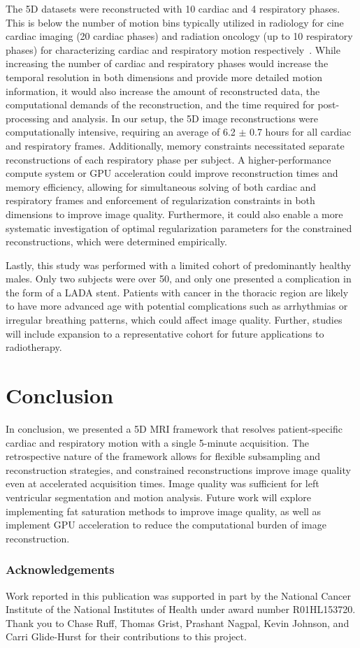 The 5D datasets were reconstructed with 10 cardiac and 4 respiratory phases. This is below the number of motion bins typically utilized in radiology for cine cardiac imaging (20 cardiac phases) and radiation oncology (up to 10 respiratory phases) for characterizing cardiac and respiratory motion respectively~\cite{kramerStandardizedCardiovascularMagnetic2020,americansocietyofradiationoncologyGuideRadiationOncology2010}. While increasing the number of cardiac and respiratory phases would increase the temporal resolution in both dimensions and provide more detailed motion information, it would also increase the amount of reconstructed data, the computational demands of the reconstruction, and the time required for post-processing and analysis. In our setup, the 5D image reconstructions were computationally intensive, requiring an average of 6.2 $\pm$ 0.7 hours for all cardiac and respiratory frames. Additionally, memory constraints necessitated separate reconstructions of each respiratory phase per subject. A higher-performance compute system or GPU acceleration could improve reconstruction times and memory efficiency, allowing for simultaneous solving of both cardiac and respiratory frames and enforcement of regularization constraints in both dimensions to improve image quality. Furthermore, it could also enable a more systematic investigation of optimal regularization parameters for the constrained reconstructions, which were determined empirically.

Lastly, this study was performed with a limited cohort of predominantly healthy males. Only two subjects were over 50, and only one presented a complication in the form of a LADA stent. Patients with cancer in the thoracic region are likely to have more advanced age with potential complications such as arrhythmias or irregular breathing patterns, which could affect image quality. Further, studies will include expansion to a representative cohort for future applications to radiotherapy.

\section{Conclusion}
In conclusion, we presented a 5D MRI framework that resolves patient-specific cardiac and respiratory motion with a single 5-minute acquisition. The retrospective nature of the framework allows for flexible subsampling and reconstruction strategies, and constrained reconstructions improve image quality even at accelerated acquisition times. Image quality was sufficient for left ventricular segmentation and motion analysis. Future work will explore implementing fat saturation methods to improve image quality, as well as implement GPU acceleration to reduce the computational burden of image reconstruction. 

\subsubsection{Acknowledgements}
Work reported in this publication was supported in part by the National Cancer Institute of the National Institutes of Health under award number R01HL153720. Thank you to Chase Ruff, Thomas Grist, Prashant Nagpal, Kevin Johnson, and Carri Glide-Hurst for their contributions to this project. 